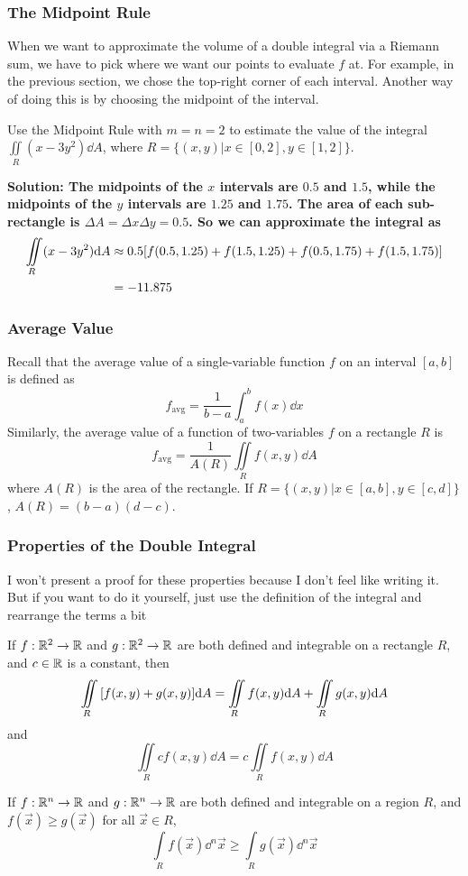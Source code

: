 \subsubsection{The Midpoint Rule}
When we want to approximate the volume of a double integral via a Riemann sum, we have to pick where we want our points to evaluate \( f \) at. For example, in the previous section, we chose the top-right corner of each interval. Another way of doing this is by choosing the midpoint of the interval.
\begin{example}
    Use the Midpoint Rule with \( m=n=2 \) to estimate the value of the integral \( \iint\limits_R (x-3y^2)\dd A \), where \( R = \{(x,y)|x\in[0, 2], y\in[1, 2]\} \).\par\bf{Solution: }The midpoints of the \( x \) intervals are \( 0.5 \) and \( 1.5 \), while the midpoints of the \( y \) intervals are \( 1.25 \) and \( 1.75 \). The area of each sub-rectangle is \( \Delta A = \Delta x\Delta y = 0.5 \). So we can approximate the integral as 
    \begin{align*}
        \iint\limits_R(x-3y^2)\dd A &\approx 0.5\bqty{f(0.5, 1.25)+f(1.5, 1.25)+f(0.5, 1.75)+f(1.5,1.75)} \\
        &= -11.875
    \end{align*}
\end{example}
\subsubsection{Average Value}
Recall that the average value of a single-variable function \( f \) on an interval \( [a, b] \) is defined as 
\[ f_{\text{avg}}=\frac{1}{b-a}\int_a^bf(x)\dd x\]
Similarly, the average value of a function of two-variables \( f \) on a rectangle \( R \) is
\[ f_{\text{avg}}=\frac{1}{A(R)}\iint\limits_Rf(x,y)\dd A\]
where \( A(R) \) is the area of the rectangle. If \( R=\{(x,y)|x\in[a,b],y\in[c,d]\} \), \( A(R) = (b-a)(d-c) \).
\subsubsection{Properties of the Double Integral}
I won't present a proof for these properties because I don't feel like writing it. But if you want to do it yourself, just use the definition of the integral and rearrange the terms a bit
\begin{theorem}
    If \( f: \mathbb{R}^2\to \mathbb{R} \) and \( g: \mathbb{R}^2\to \mathbb{R} \) are both defined and integrable on a rectangle \( R \), and \( c\in\mathbb{R} \) is a constant, then
    \[ \iint\limits_R\bqty{f(x,y)+g(x,y)}\dd A = \iint\limits_Rf(x,y)\dd A + \iint\limits_Rg(x,y)\dd A\]
    and
    \[ \iint\limits_Rcf(x,y)\dd A = c\iint\limits_Rf(x,y)\dd A\]
\end{theorem}
\begin{theorem}
    If \( f: \mathbb{R}^n\to \mathbb{R} \) and \( g: \mathbb{R}^n\to \mathbb{R} \) are both defined and integrable on a region \( R \), and \( f(\vec x) \geq g(\vec x) \) for all \( \vec x\in R \),
    \[ \int\limits_Rf(\vec x)\dd^n \vec x \geq \int\limits_Rg(\vec x)\dd^n \vec x\]
\end{theorem}
